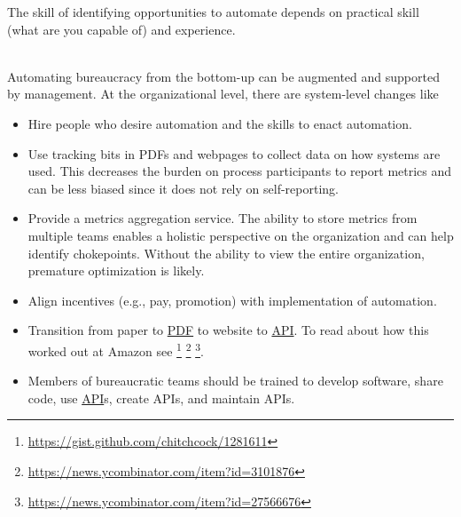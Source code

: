 The skill of identifying opportunities to automate depends on practical skill (what are you capable of) and experience.

\ \\
Automating bureaucracy from the bottom-up can be augmented and supported by management. 
At the organizational level, there are system-level changes like
\begin{itemize}
    \item Hire people who desire automation and the skills to enact automation.
    \item Use tracking bits in PDFs and webpages to collect data on how systems are used. This decreases the burden on process participants to report metrics and can be less biased since it does not rely on self-reporting.
    \item Provide a metrics aggregation service. The ability to store metrics from multiple teams enables a holistic perspective on the organization and can help identify chokepoints. Without the ability to view the entire organization, premature optimization is likely.
    \item Align incentives (e.g., pay, promotion) with implementation of automation.
    \item Transition from paper to \href{https://en.wikipedia.org/wiki/PDF}{PDF} 
    to website to \href{https://en.wikipedia.org/wiki/API}{API}. 
    To read about how this worked out at Amazon see \footnote{\href{https://gist.github.com/chitchcock/1281611}{https://gist.github.com/chitchcock/1281611}}
    \footnote{\href{https://news.ycombinator.com/item?id=3101876}{https://news.ycombinator.com/item?id=3101876}}
    \footnote{\href{https://news.ycombinator.com/item?id=27566676}{https://news.ycombinator.com/item?id=27566676}}.
    \item Members of bureaucratic teams should be trained to develop software, share code, use \href{https://en.wikipedia.org/wiki/API}{API}s, 
    create APIs, and maintain APIs.
\end{itemize}
